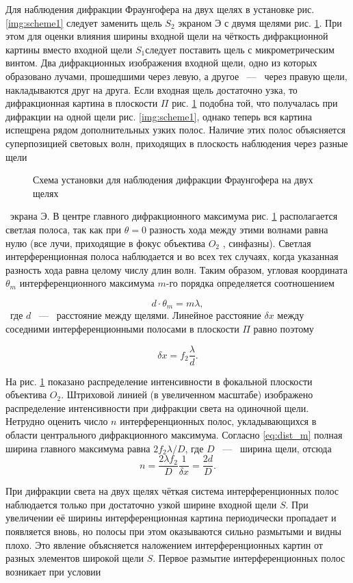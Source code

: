 Для наблюдения дифракции Фраунгофера на двух щелях в установке
рис. \ref{img:scheme1} следует заменить щель $S_2$ экраном $Э$ с двумя щелями рис. \ref{img:slits}.
При этом для оценки влияния ширины входной щели на чёткость дифракционной картины вместо входной щели $S_1$следует поставить щель
с микрометрическим винтом. Два дифракционных изображения входной
щели, одно из которых образовано лучами, прошедшими через левую, а
другое ~---~ через правую щели, накладываются друг на друга.
Если входная щель достаточно узка, то дифракционная картина
в плоскости $\Pi$ рис. \ref{img:slits} подобна той, что получалась при дифракции на
одной щели рис. \ref{img:scheme1}, однако теперь вся картина испещрена рядом дополнительных узких полос. Наличие этих полос объясняется суперпозицией
световых волн, приходящих в плоскость наблюдения через разные щели

\begin{figure}[h]
  \caption{Схема установки для наблюдения дифракции Фраунгофера на двух щелях}
  \label{img:slits}
\end{figure} 
\
экрана Э. В центре главного дифракционного максимума рис. \ref{img:slits} располагается светлая полоса, так как при $\theta = 0$ разность хода между этими
волнами равна нулю (все лучи, приходящие в фокус объектива $O_2$ , синфазны). Светлая интерференционная полоса наблюдается и во всех тех
случаях, когда указанная разность хода равна целому числу длин волн.
Таким образом, угловая координата $\theta_m$ интерференционного максимума $m$-го порядка определяется соотношением

\begin{equation}
  d \cdot \theta_m = m\lambda,
\end{equation} \label{eq:fraunmax}
\
где $d$ ~---~ расстояние между щелями.
Линейное расстояние $\delta x$ между соседними интерференционными 
полосами в плоскости $\Pi$ равно поэтому

\begin{equation}
  \delta x = f_2 \frac{\lambda}{d}.
\end{equation} \label{eq:fraundx}

На рис. \ref{img:slits} показано распределение интенсивности в фокальной 
плоскости объектива $O_2$. Штриховой линией (в увеличенном масштабе) 
изображено распределение интенсивности при дифракции света на одиночной
щели.
Нетрудно оценить число $n$ интерференционных полос, 
укладывающихся в области центрального дифракционного максимума. 
Согласно \eqref{eq:dist_m} полная ширина главного максимума равна $ 2f_2 \lambda /D$, где $D$ ~---~ 
ширина щели, отсюда
\begin{equation}
  n = \frac{2\lambda f_2}{D} \frac{1}{\delta x} = \frac{2d}{D}.
\end{equation}\label{eq:intnum}

При дифракции света на двух щелях чёткая система 
интерференционных полос наблюдается только при достаточно узкой ширине входной
щели $S$. При увеличении её ширины интерференционная картина 
периодически пропадает и появляется вновь, но полосы при этом оказываются
сильно размытыми и видны плохо. Это явление объясняется 
наложением интерференционных картин от разных элементов широкой щели $S$.
Первое размытие интерференционных полос возникает при условии